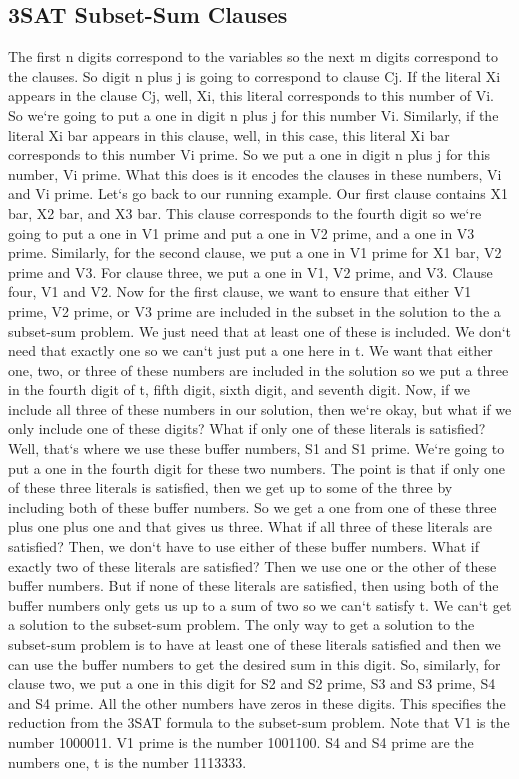 \subsection{3SAT Subset-Sum  Clauses}
The first n digits correspond to the variables so the next m digits correspond to the clauses.
So digit n plus j is going to correspond to clause Cj.
If the literal Xi appears in the clause Cj, well, Xi, this literal corresponds to this number of Vi.
So we`re going to put a one in digit n plus j for this number Vi.
Similarly, if the literal Xi bar appears in this clause, well, in this case, this literal Xi bar corresponds to this number Vi prime.
So we put a one in digit n plus j for this number, Vi prime.
What this does is it encodes the clauses in these numbers, Vi and Vi prime.
Let`s go back to our running example.
Our first clause contains X1 bar, X2 bar, and X3 bar.
This clause corresponds to the fourth digit so we`re going to put a one in V1 prime and put a one in V2 prime, and a one in V3 prime.
Similarly, for the second clause, we put a one in V1 prime for X1 bar, V2 prime and V3.
For clause three, we put a one in V1, V2 prime, and V3.
Clause four, V1 and V2.
Now for the first clause, we want to ensure that either V1 prime, V2 prime, or V3 prime are included in the subset in the solution to the a subset-sum problem.
We just need that at least one of these is included.
We don`t need that exactly one so we can`t just put a one here in t.
We want that either one, two, or three of these numbers are included in the solution so we put a three in the fourth digit of t, fifth digit, sixth digit, and seventh digit.
Now, if we include all three of these numbers in our solution, then we`re okay, but what if we only include one of these digits? What if only one of these literals is satisfied? Well, that`s where we use these buffer numbers, S1 and S1 prime.
We`re going to put a one in the fourth digit for these two numbers.
The point is that if only one of these three literals is satisfied, then we get up to some of the three by including both of these buffer numbers.
So we get a one from one of these three plus one plus one and that gives us three.
What if all three of these literals are satisfied? Then, we don`t have to use either of these buffer numbers.
What if exactly two of these literals are satisfied? Then we use one or the other of these buffer numbers.
But if none of these literals are satisfied, then using both of the buffer numbers only gets us up to a sum of two so we can`t satisfy t.
We can`t get a solution to the subset-sum problem.
The only way to get a solution to the subset-sum problem is to have at least one of these literals satisfied and then we can use the buffer numbers to get the desired sum in this digit.
So, similarly, for clause two, we put a one in this digit for S2 and S2 prime, S3 and S3 prime, S4 and S4 prime.
All the other numbers have zeros in these digits.
This specifies the reduction from the 3SAT formula to the subset-sum problem.
Note that V1 is the number 1000011.
V1 prime is the number 1001100.
S4 and S4 prime are the numbers one, t is the number 1113333.

